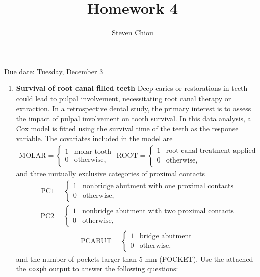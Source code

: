 \documentclass[]{article}
\title{Homework 4}
\author{Steven Chiou}
\date{}
\providecommand{\tightlist}{%
  \setlength{\itemsep}{0pt}\setlength{\parskip}{0pt}}
\begin{document}
\maketitle

\centering Due date: Tuesday, December 3

\begin{enumerate}
\def\labelenumi{\arabic{enumi}.}
\tightlist
\item
  \textbf{Survival of root canal filled teeth} Deep caries or
  restorations in teeth could lead to pulpal involvement, necessitating
  root canal therapy or extraction. In a retrospective dental study, the
  primary interest is to assess the impact of pulpal involvement on
  tooth survival. In this data analysis, a Cox model is fitted using the
  survival time of the teeth as the response variable. The covariates
  included in the model are \[
  \begin{aligned}
  \mbox{MOLAR} = \left\{\begin{matrix}
  1 & \mbox{molar tooth}\\ 
  0 & \mbox{otherwise,}
  \end{matrix}\right.\,\,  
  \mbox{ROOT} = \left\{\begin{matrix}
  1 & \mbox{root canal treatment applied}\\ 
  0 & \mbox{otherwise,}
  \end{matrix}\right. \,\,\,\,
  \end{aligned}
  \] and three mutually exclusive categories of proximal contacts \[
  \begin{aligned}
  \mbox{PC1} = \left\{\begin{matrix}
  1 & \mbox{nonbridge abutment with one proximal contacts}\\ 
  0 & \mbox{otherwise,}
  \end{matrix}\right.
  \end{aligned}
  \] \[
  \begin{aligned}
  \mbox{PC2} = \left\{\begin{matrix}
  1 & \mbox{nonbridge abutment with two proximal contacts}\\ 
  0 & \mbox{otherwise,}
  \end{matrix}\right. 
  \end{aligned}
  \] \[
  \begin{aligned}
  \mbox{PCABUT} = \left\{\begin{matrix}
  1 & \mbox{bridge abutment}\\ 
  0 & \mbox{otherwise,}
  \end{matrix}\right. \,\,
  \end{aligned}
  \] and the number of pockets larger than 5 mm (POCKET). Use the
  attached the \texttt{coxph} output to answer the following questions:
\end{enumerate}
\end{document}
